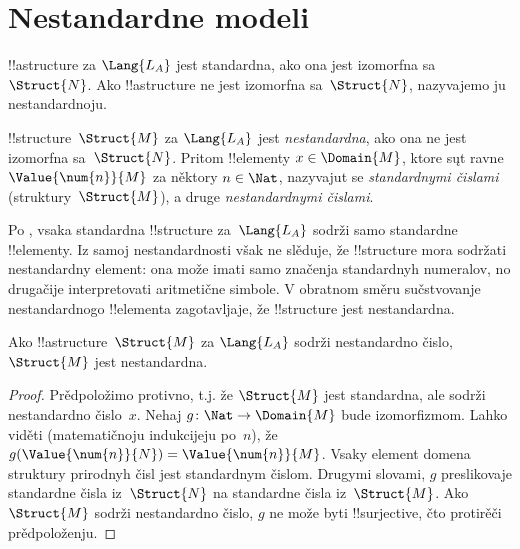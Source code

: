 \documentclass[../../../include/open-logic-section]{subfiles}
\begin{document}
\section{Nestandardne modeli}

\begin{explain}
!!a{structure} za $\Lang{L_A}$ jest standardna, ako ona jest izomorfna
sa~$\Struct{N}$. Ako !!a{structure} ne jest izomorfna sa~$\Struct{N}$,
nazyvajemo ju nestandardnoju.
\end{explain}

\begin{defn}
!!{structure}~$\Struct{M}$ za $\Lang{L_A}$ jest \emph{nestandardna},
ako ona ne jest izomorfna sa~$\Struct{N}$. Pritom !!{element}y $x \in
\Domain{M}$, ktore sųt ravne $\Value{\num{n}}{M}$ za něktory $n \in
\Nat$, nazyvajut se \emph{standardnymi čislami} (struktury~$\Struct{M}$), a druge
\emph{nestandardnymi čislami}.
\end{defn}

\begin{explain}
Po , vsaka standardna !!{structure}
za~$\Lang{L_A}$ sodrži samo standardne !!{element}y. Iz samoj
nestandardnosti však ne slěduje, že !!{structure} mora sodržati
nestandardny element: ona može imati samo značenja standardnyh
numeralov, no drugačije interpretovati aritmetične simbole. V obratnom
směru sučstvovanje nestandardnogo !!{element}a zagotavljaje, že
!!{structure} jest nestandardna.
\end{explain}

\begin{prop}
Ako !!a{structure}~$\Struct{M}$ za $\Lang{L_A}$ sodrži
nestandardno čislo, $\Struct{M}$ jest nestandardna.
\end{prop}

\begin{proof}
Prědpoložimo protivno, t.j. že $\Struct{M}$ jest standardna, ale sodrži
nestandardno čislo~$x$. Nehaj $g\colon \Nat \to \Domain{M}$ bude
izomorfizmom. Lahko viděti (matematičnoju indukcijeju po~$n$), že
$g(\Value{\num{n}}{N}) = \Value{\num{n}}{M}$. Vsaky element domena
struktury prirodnyh čisl jest standardnym čislom. Drugymi slovami, $g$ preslikovaje
standardne čisla iz~$\Struct{N}$ na standardne čisla
iz~$\Struct{M}$. Ako $\Struct{M}$ sodrži nestandardno čislo, $g$
ne može byti !!{surjective}, čto protirěči prědpoloženju.
\end{proof}
\end{document}
